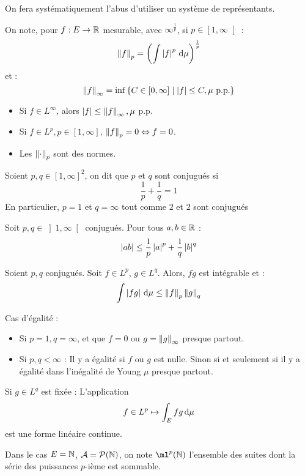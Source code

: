 \documentclass{cours}
\begin{document}
On fera systématiquement l'abus d'utiliser un système de représentants.

\begin{definition}
    On note, pour $f : E \rightarrow \mathbb{R}$ mesurable, avec $\infty^{\frac{1}{p}}$, si $p \in \left[1, \infty\right[$ :
    \[
        \left\lVert f \right\rVert_{p} = \left(\int \left|f\right|^{p}{\rm \, d} \mu\right)^{\frac{1}{p}}
    \]
    et :
    \[
        \left\lVert f \right\rVert_{\infty} = \inf \left\{C \in \left[0, \infty\right] \mid \left|f\right| \leq C, \mu \text{ p.p.}\right\}
    \]
\end{definition}

\begin{proposition}
    \begin{itemize}
        \item Si $f \in L^{\infty}$, alors $\left|f\right| \leq \left\lVert f \right\rVert_{\infty}, \mu$ p.p.
        \item Si $f \in L^{p}, p \in \left[1, \infty\right]$, $\left\lVert f \right\rVert_{p} = 0 \Leftrightarrow f = 0$.
        \item Les $\left\lVert \cdot \right\rVert_{p}$ sont des normes.
    \end{itemize}
\end{proposition}

\begin{definition}
    Soient $p, q \in \left[1, \infty\right]^{2}$, on dit que $p$ et $q$ sont conjugués si
    \[
        \frac{1}{p} + \frac{1}{q} = 1
    \]
    En particulier, $p = 1$ et $q = \infty$ tout comme $2$ et $2$ sont conjugués
\end{definition}

\begin{lemma}
    Soit $p, q \in \left]1, \infty\right[$ conjugués. Pour tous $a, b \in \mathbb{R}$ :
    \[
        \left|ab\right| \leq \frac{1}{p}\left|a\right|^{p} + \frac{1}{q}\left|b\right|^{q}
    \]
\end{lemma}
\begin{proposition}
    Soient $p, q$ conjugués. Soit $f \in L^{p}$, $g \in L^{q}$. Alors, $fg$ est intégrable et :
    \[
        \int \left|fg\right| {\rm \, d} \mu \leq \left\lVert f \right\rVert_{p}\left\lVert g \right\rVert_{q}
    \]
\end{proposition}
\begin{remark}
    Cas d'égalité :
    \begin{itemize}
        \item Si $p = 1, q = \infty$, et que $f = 0$ ou $g = \left\lVert g \right\rVert_{\infty}$ presque partout.
        \item Si $p, q < \infty$ : Il y a égalité si $f$ ou $g$ est nulle. Sinon si et seulement si il y a égalité dans l'inégalité de Young $\mu$ presque partout.
    \end{itemize}
\end{remark}
\begin{remark}
    Si $g \in L^{q}$ est fixée : L'application
    \[
        f \in L^{p} \mapsto \int_{E}fg {\rm \, d} \mu
    \]
    est une forme linéaire continue.
\end{remark}
\begin{remark}
    Dans le cas $E = \mathbb{N}$, $\mathcal{A} = \mathcal{P}(\mathbb{N})$, on note $\ml^{p}(\N)$ l'ensemble des suites dont la série des puissances $p$-ième est sommable.
\end{remark}
\end{document}
